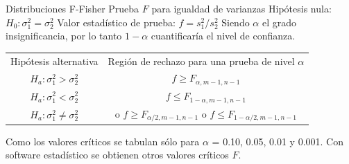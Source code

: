 \documentclass[11pt]{beamer}
\begin{document}
      \begin{frame}{Distribuciones F-Fisher}
        Prueba $F$ para igualdad de varianzas
        \pause
        Hipótesis nula: $H_0: \sigma^2_1 = \sigma^2_2
$
        \pause
        Valor estadístico de prueba: $f = s^2_1/s^2_2$
        Siendo $\alpha$ el grado insignificancia, por lo tanto $1 -\alpha$ cuantificaría el nivel de confianza.
        \pause
        \vspace{1px}
        \begin{center}
            \begin{tabular}{cc}
            Hipótesis alternativa          &   Región de rechazo para una prueba de nivel $\alpha$\\
            $H_a: \sigma^2_1 > \sigma^2_2$ & $f \geq F_{\alpha,m-1,n-1}$ \\
            $H_a: \sigma^2_1 < \sigma^2_2$ & $f \leq F_{1-\alpha,m-1,n-1}$ \\
            $H_a: \sigma^2_1 \neq \sigma^2_2$ & o $f \geq F_{\alpha/2,m-1,n-1}$ o $f \leq F_{1-\alpha/2,m-1,n-1}$ \\
        \end{tabular}
        \end{center}

        \vspace{1px}

        Como los valores críticos se tabulan sólo para $\alpha$ = 0.10, 0.05, 0.01 y 0.001. Con software
estadístico se obtienen otros valores críticos $F$.
      \end{frame}
\end{document}
